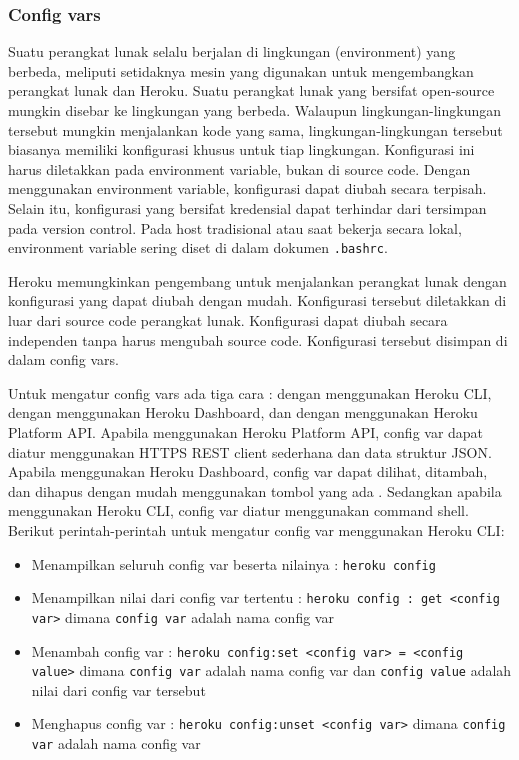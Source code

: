 \subsubsection{Config vars}
Suatu perangkat lunak selalu berjalan di lingkungan (environment) yang berbeda, meliputi setidaknya mesin yang digunakan untuk mengembangkan perangkat lunak dan Heroku. Suatu perangkat lunak yang bersifat open-source mungkin disebar ke lingkungan yang berbeda. Walaupun lingkungan-lingkungan tersebut mungkin menjalankan kode yang sama, lingkungan-lingkungan tersebut biasanya memiliki konfigurasi khusus untuk tiap lingkungan. Konfigurasi ini harus diletakkan pada environment variable, bukan di source code. Dengan menggunakan environment variable, konfigurasi dapat diubah secara terpisah. Selain itu, konfigurasi yang bersifat kredensial dapat terhindar dari tersimpan pada version control. Pada host tradisional atau saat bekerja secara lokal, environment variable sering diset di dalam dokumen \texttt{.bashrc}.

Heroku memungkinkan pengembang untuk menjalankan perangkat lunak dengan konfigurasi yang dapat diubah dengan mudah. Konfigurasi tersebut diletakkan di luar dari source code perangkat lunak. Konfigurasi dapat diubah secara independen tanpa harus mengubah source code. Konfigurasi tersebut disimpan di dalam config vars.

Untuk mengatur config vars ada tiga cara : dengan menggunakan Heroku CLI, dengan menggunakan Heroku Dashboard, dan dengan menggunakan Heroku Platform API. Apabila menggunakan Heroku Platform API, config var dapat diatur menggunakan HTTPS REST client sederhana dan data struktur JSON. Apabila menggunakan Heroku Dashboard, config var dapat dilihat, ditambah, dan dihapus dengan mudah menggunakan tombol yang ada %
. Sedangkan apabila menggunakan Heroku CLI, config var diatur menggunakan command shell. Berikut perintah-perintah untuk mengatur config var menggunakan Heroku CLI:
\begin{itemize}
\item Menampilkan seluruh config var beserta nilainya : \texttt{\textdollar heroku config}
\item Menampilkan nilai dari config var tertentu : \texttt{\textdollar heroku config : get <config var>} dimana \texttt{config var} adalah nama config var
\item Menambah config var : \texttt{\textdollar heroku config:set <config var> = <config value>} dimana \texttt{config var} adalah nama config var dan \texttt{config value} adalah nilai dari config var tersebut
\item Menghapus config var : \texttt{\textdollar heroku config:unset <config var>} dimana \texttt{config var} adalah nama config var
\end{itemize}

